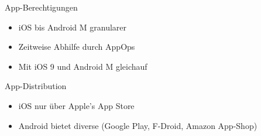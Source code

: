\begin{frame}
	\begin{block}{}
		App-Berechtigungen
	\end{block}
	\begin{itemize}
	  \item iOS bis Android M granularer
	  \item Zeitweise Abhilfe durch AppOps
	  \item Mit iOS 9 und Android M gleichauf
	\end{itemize}
	
	\begin{block}{}
		App-Distribution
	\end{block}
	\begin{itemize}
	  \item iOS nur über Apple's App Store
	  \item Android bietet diverse (Google Play, F-Droid, Amazon App-Shop)
	\end{itemize}

\end{frame}